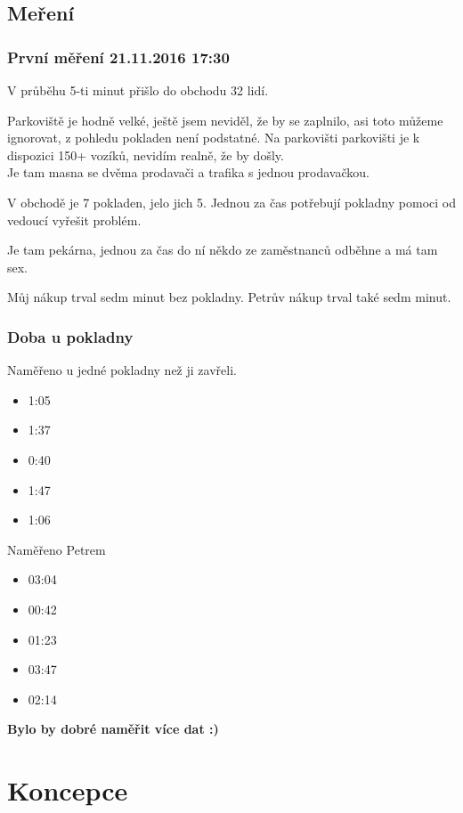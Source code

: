 \documentclass[12pt,a4paper]{report}
\begin{document}
\section{Meření}
\subsection{První měření 21.11.2016 17:30}
V průběhu 5-ti minut přišlo do obchodu 32 lidí.

Parkoviště je hodně velké, ještě jsem neviděl, že by se zaplnilo, asi toto můžeme ignorovat, z pohledu pokladen není podstatné.
Na parkovišti parkovišti je k dispozici 150+ vozíků, nevidím realně, že by došly.
\\
Je tam masna se dvěma prodavači a trafika s jednou prodavačkou.

V obchodě je 7 pokladen, jelo jich 5. Jednou za čas potřebují pokladny pomoci od vedoucí vyřešit problém.

Je tam pekárna, jednou za čas do ní někdo ze zaměstnanců odběhne a má tam sex.

Můj nákup trval sedm minut bez pokladny. Petrův nákup trval také sedm minut.

\subsection{Doba u pokladny}
Naměřeno u jedné pokladny než ji zavřeli.
\begin{itemize}
\item 1:05
\item 1:37
\item 0:40
\item 1:47
\item 1:06
\end{itemize}
Naměřeno Petrem
\begin{itemize}
\item 03:04
\item 00:42
\item 01:23
\item 03:47
\item 02:14
\end{itemize}


\textbf{Bylo by dobré naměřit více dat :) }
\chapter{Koncepce}
\end{document}
